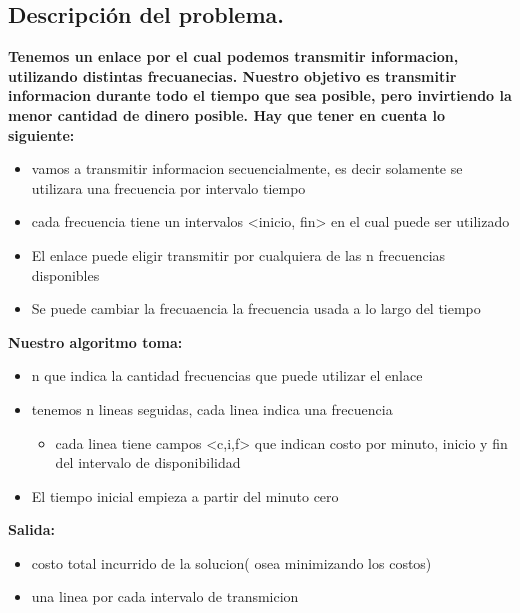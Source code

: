 \subsection{Descripción del problema.}

\vspace*{0.3cm}

\textbf{
Tenemos un enlace por el cual podemos transmitir informacion, utilizando distintas frecuanecias.
Nuestro objetivo es transmitir informacion durante todo el tiempo que sea posible, pero invirtiendo
la menor cantidad de dinero posible.
Hay que tener en cuenta lo siguiente:
}

\begin{itemize}
	\item vamos a transmitir informacion secuencialmente, es decir solamente se utilizara una frecuencia por intervalo
		 tiempo 
	\item cada frecuencia tiene un intervalos <inicio, fin> en el cual puede ser utilizado
	\item El enlace puede eligir transmitir por cualquiera de las n frecuencias disponibles
	\item Se puede cambiar la frecuaencia la frecuencia usada a lo largo del tiempo
\end{itemize}

\textbf{Nuestro algoritmo toma:}
\begin{itemize}
	\item n que indica la cantidad frecuencias que puede utilizar el enlace
	\item tenemos n lineas seguidas, cada linea indica una frecuencia
	\begin{itemize}
		\item cada linea tiene campos <c,i,f> que indican costo por minuto, inicio y fin del intervalo de disponibilidad
	\end{itemize}
	\item El tiempo inicial empieza a partir del minuto cero
\end{itemize}

\textbf{Salida:}
\begin{itemize}
	  \item costo total incurrido de la solucion( osea minimizando los costos)
	  \item una linea por cada intervalo de transmicion 
\end{itemize}




